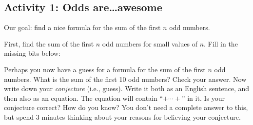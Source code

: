 \documentclass[11pt]{exam}
\begin{document}
\subsection*{Activity 1: Odds are\ldots awesome}
Our goal: find a nice formula for the sum of the first $n$ odd numbers.
\begin{questions}
  \question First, find the sum of the first $n$ odd numbers for small values of $n$.  Fill in the missing bits below:
  \begin{multicols}{2}

  \end{multicols}

  \question Perhaps you now have a guess for a formula for the sum of the first $n$ odd numbers.  What is the sum of the first 10 odd numbers?  Check your answer.
  \vfill
  \question Now write down your {\em conjecture} (i.e., guess).  Write it both as an English sentence, and then also as an equation.  The equation will contain ``$+\cdots +$'' in it.
  \vfill
  \question Is your conjecture correct?  How do you know?  You don't need a complete answer to this, but spend 3 minutes thinking about your reasons for believing your conjecture.



\end{questions}
\end{document}
